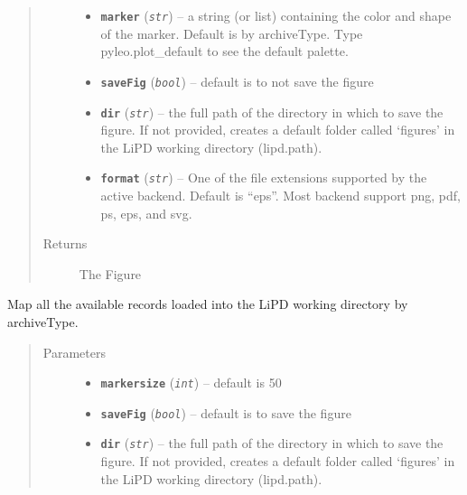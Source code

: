 \documentclass[letterpaper,10pt,english]{sphinxmanual}
\begin{document}
\begin{fulllineitems}
\begin{fulllineitems}
\begin{quote}
\begin{description}
\begin{itemize}
\item {} 
\textbf{\texttt{marker}} (\emph{\texttt{str}}) -- a string (or list) containing the color and shape of
the marker. Default is by archiveType. Type pyleo.plot\_default
to see the default palette.

\item {} 
\textbf{\texttt{saveFig}} (\emph{\texttt{bool}}) -- default is to not save the figure

\item {} 
\textbf{\texttt{dir}} (\emph{\texttt{str}}) -- the full path of the directory in which to save the
figure. If not provided, creates a default folder called
`figures' in the LiPD working directory (lipd.path).

\item {} 
\textbf{\texttt{format}} (\emph{\texttt{str}}) -- One of the file extensions supported by the active
backend. Default is ``eps''. Most backend support png, pdf, ps,
eps, and svg.

\end{itemize}

\item[{Returns}] \leavevmode
The Figure

\end{description}\end{quote}

\end{fulllineitems}


\begin{fulllineitems}
\label{Mapping:pyleoclim.Map.map_all}
Map all the available records loaded into the LiPD working directory by archiveType.
\begin{quote}\begin{description}
\item[{Parameters}] \leavevmode\begin{itemize}
\item {} 
\textbf{\texttt{markersize}} (\emph{\texttt{int}}) -- default is 50

\item {} 
\textbf{\texttt{saveFig}} (\emph{\texttt{bool}}) -- default is to save the figure

\item {} 
\textbf{\texttt{dir}} (\emph{\texttt{str}}) -- the full path of the directory in which to save the
figure. If not provided, creates a default folder called
`figures' in the LiPD working directory (lipd.path).


\end{itemize}
\end{description}
\end{quote}
\end{fulllineitems}
\end{fulllineitems}
\end{document}
